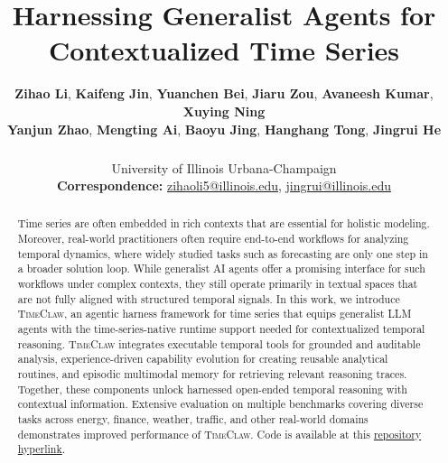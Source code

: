\documentclass[11pt]{article}
\title{Harnessing Generalist Agents for Contextualized Time Series}
\author{
 \textbf{Zihao Li}, %
 \textbf{Kaifeng Jin}, 
 \textbf{Yuanchen Bei},
 \textbf{Jiaru Zou},
 \textbf{Avaneesh Kumar},
 \textbf{Xuying Ning}
 \\
 \textbf{Yanjun Zhao}, 
 \textbf{Mengting Ai},
 \textbf{Baoyu Jing}, 
 \textbf{Hanghang Tong},
 \textbf{Jingrui He}
\\
\\
 \textsuperscript{}University of Illinois Urbana-Champaign
\\
 \small{
   \textbf{Correspondence:} \href{mailto:zihaoli5@illinois.edu}{zihaoli5@illinois.edu}, \href{mailto:jingrui@illinois.edu}{jingrui@illinois.edu}
 }
}
\newcommand{\method}{\textsc{TimeClaw}\xspace}
\begin{document}
\maketitle
\begin{abstract}
Time series are often embedded in rich contexts that are essential for holistic modeling. Moreover, real-world practitioners often require end-to-end workflows for analyzing temporal dynamics, where widely studied tasks such as forecasting are only one step in a broader solution loop. While generalist AI agents offer a promising interface for such workflows under complex contexts, they still operate primarily in textual spaces that are not fully aligned with structured temporal signals. 
In this work, we introduce \method, an agentic harness framework for time series that equips generalist LLM agents with the time-series-native runtime support needed for contextualized temporal reasoning. \method integrates executable temporal tools for grounded and auditable analysis, experience-driven capability evolution for creating reusable analytical routines, and episodic multimodal memory for retrieving relevant reasoning traces. Together, these components unlock harnessed open-ended temporal reasoning with contextual information.
Extensive evaluation on multiple benchmarks covering diverse tasks across energy, finance, weather, traffic, and other real-world domains demonstrates improved performance of \method. Code is available at this \textcolor{cvprblue}{\href{https://github.com/iDEA-iSAIL-Lab-UIUC/TimeClaw}{repository hyperlink}}.
\end{abstract}

{\protect\setcounter{tocdepth}{-1}}














% 



\clearpage


\end{document}

